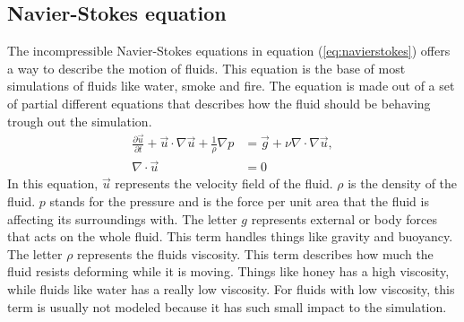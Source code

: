 \subsection{Navier-Stokes equation}
The incompressible Navier-Stokes equations in equation (\ref{eq:navierstokes}) offers a way to describe the motion of fluids. 
This equation is the base of most simulations of fluids like water, smoke and fire. 
The equation is made out of a set of partial different equations that describes how the fluid should be behaving trough out the simulation.
\begin{equation}
  \label{eq:navierstokes}
  \begin{split} 
    \frac{\partial \vec{u}}{\partial t} + \vec{u} \cdot \nabla \vec{u} + \frac{1}{\rho} \nabla p &= \vec{g} + \nu \nabla \cdot \nabla \vec{u},\\ 
    \nabla\cdot \vec{u} &= 0
  \end{split}
\end{equation}
In this equation, $\vec{u}$ represents the velocity field of the fluid. 
$\rho$ is the density of the fluid. 
$p$ stands for the pressure and is the force per unit area that the fluid is affecting its surroundings with. 
The letter $g$ represents external or body forces that acts on the whole fluid. 
This term handles things like gravity and buoyancy. 
The letter $\rho$ represents the fluids viscosity. 
This term describes how much the fluid resists deforming while it is moving. 
Things like honey has a high viscosity, while fluids like water has a really low viscosity. 
For fluids with low viscosity, this term is usually not modeled because it has such small impact to the simulation.
\\
\\